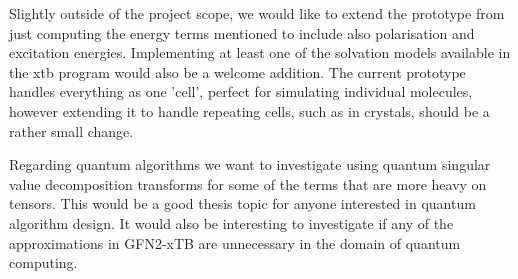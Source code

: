 Slightly outside of the project scope, we would like to extend the prototype from just computing the energy terms mentioned to include also polarisation and excitation energies. Implementing at least one of the solvation models available in the xtb program would also be a welcome addition. The current prototype handles everything as one 'cell', perfect for simulating individual molecules, however extending it to handle repeating cells, such as in crystals, should be a rather small change. 

Regarding quantum algorithms we want to investigate using quantum singular value decomposition transforms for some of the terms that are more heavy on tensors. This would be a good thesis topic for anyone interested in quantum algorithm design. It would also be interesting to investigate if any of the approximations in GFN2-xTB are unnecessary in the domain of quantum computing.
